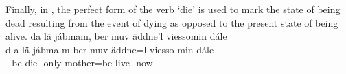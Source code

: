 \z
Finally, in , the perfect form of the verb  ‘die’ is used 
to mark the state of being dead resulting from the event of dying as opposed to the present state of being alive. 
\ea\label{perfectEx3}%
\glll	da lä jábmam, ber muv äddne'l viessomin dále\\
	d-a lä jábma-m ber muv äddne=l viesso-min dále\\
	-\BS{} be\BS{} die- only  mother\BS{}=be\BS{} live- now\\\nopagebreak
{}	
\z

